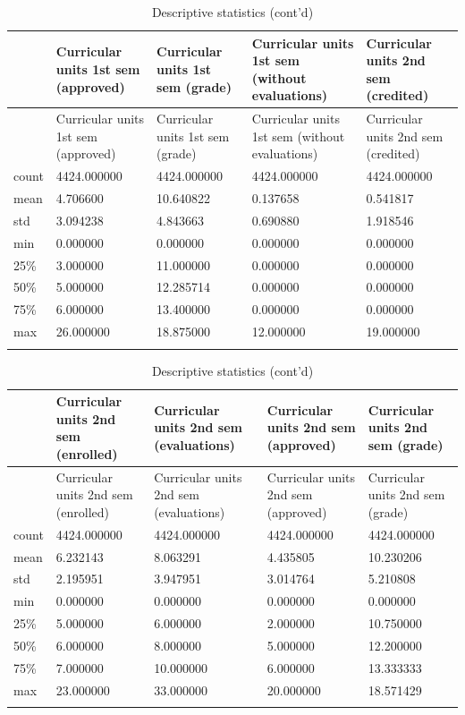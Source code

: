\documentclass[
  letterpaper,
  DIV=11,
  numbers=noendperiod]{scrartcl}
\begin{document}
\hypertarget{tab-descstat-6}{}
\begin{longtable}[]{@{}lllll@{}}
\toprule\noalign{}
& Curricular units 1st sem (approved) & Curricular units 1st sem (grade)
& Curricular units 1st sem (without evaluations) & Curricular units 2nd
sem (credited) \\
\midrule\noalign{}
\endfirsthead
\toprule\noalign{}
& Curricular units 1st sem (approved) & Curricular units 1st sem (grade)
& Curricular units 1st sem (without evaluations) & Curricular units 2nd
sem (credited) \\
\midrule\noalign{}
\endhead
\bottomrule\noalign{}
\endlastfoot
count & 4424.000000 & 4424.000000 & 4424.000000 & 4424.000000 \\
mean & 4.706600 & 10.640822 & 0.137658 & 0.541817 \\
std & 3.094238 & 4.843663 & 0.690880 & 1.918546 \\
min & 0.000000 & 0.000000 & 0.000000 & 0.000000 \\
25\% & 3.000000 & 11.000000 & 0.000000 & 0.000000 \\
50\% & 5.000000 & 12.285714 & 0.000000 & 0.000000 \\
75\% & 6.000000 & 13.400000 & 0.000000 & 0.000000 \\
max & 26.000000 & 18.875000 & 12.000000 & 19.000000 \\
\caption{Descriptive statistics (cont'd) }\tabularnewline
\end{longtable}

\hypertarget{tab-descstat-7}{}
\begin{longtable}[]{@{}lllll@{}}
\toprule\noalign{}
& Curricular units 2nd sem (enrolled) & Curricular units 2nd sem
(evaluations) & Curricular units 2nd sem (approved) & Curricular units
2nd sem (grade) \\
\midrule\noalign{}
\endfirsthead
\toprule\noalign{}
& Curricular units 2nd sem (enrolled) & Curricular units 2nd sem
(evaluations) & Curricular units 2nd sem (approved) & Curricular units
2nd sem (grade) \\
\midrule\noalign{}
\endhead
\bottomrule\noalign{}
\endlastfoot
count & 4424.000000 & 4424.000000 & 4424.000000 & 4424.000000 \\
mean & 6.232143 & 8.063291 & 4.435805 & 10.230206 \\
std & 2.195951 & 3.947951 & 3.014764 & 5.210808 \\
min & 0.000000 & 0.000000 & 0.000000 & 0.000000 \\
25\% & 5.000000 & 6.000000 & 2.000000 & 10.750000 \\
50\% & 6.000000 & 8.000000 & 5.000000 & 12.200000 \\
75\% & 7.000000 & 10.000000 & 6.000000 & 13.333333 \\
max & 23.000000 & 33.000000 & 20.000000 & 18.571429 \\
\caption{Descriptive statistics (cont'd) }\tabularnewline
\end{longtable}
\end{document}

